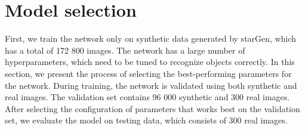 \section{Model selection} \label{sec:modelselection}

First, we train the network only on synthetic data generated by starGen, which has a total of 172 800 images. The network has a large number of hyperparameters, which need to be tuned to recognize objects correctly. In this section, we present the process of selecting the best-performing parameters for the network. During training, the network is validated using both synthetic and real images. The validation set contains 96 000 synthetic and 300 real images. After selecting the configuration of parameters that works best on the validation set, we evaluate the model on testing data, which consists of 300 real images.  














